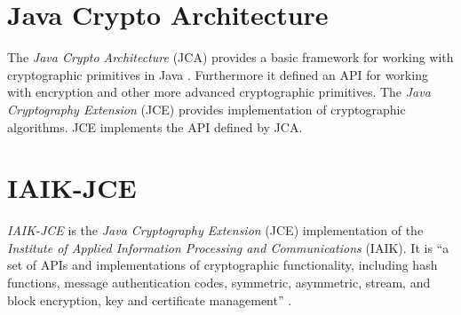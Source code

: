


\section{Java Crypto Architecture} \label{section:pre:jca}

The \textit{Java Crypto Architecture} (JCA) provides a basic framework for working with cryptographic primitives in Java \cite{JCA}. Furthermore it defined an API for working with encryption and other more advanced cryptographic primitives.
The \textit{Java Cryptography Extension} (JCE) provides implementation of cryptographic algorithms. JCE implements the API defined by JCA. 

\section{IAIK-JCE} \label{section:pre:jce} 


\textit{IAIK-JCE} is the \textit{Java Cryptography Extension} (JCE)  implementation of the \textit{Institute of Applied Information Processing and Communications} (IAIK). It is ``a set of APIs and implementations of cryptographic functionality, including hash functions, message authentication codes, symmetric, asymmetric, stream, and block encryption, key and certificate management'' \cite{IAIKJCE}.



